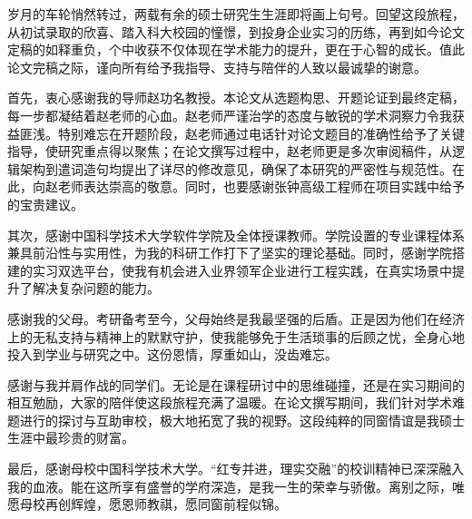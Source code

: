 \begin{acknowledgements}

岁月的车轮悄然转过，两载有余的硕士研究生生涯即将画上句号。回望这段旅程，从初试录取的欣喜、踏入科大校园的憧憬，到投身企业实习的历练，再到如今论文定稿的如释重负，个中收获不仅体现在学术能力的提升，更在于心智的成长。值此论文完稿之际，谨向所有给予我指导、支持与陪伴的人致以最诚挚的谢意。

首先，衷心感谢我的导师赵功名教授。本论文从选题构思、开题论证到最终定稿，每一步都凝结着赵老师的心血。赵老师严谨治学的态度与敏锐的学术洞察力令我获益匪浅。特别难忘在开题阶段，赵老师通过电话针对论文题目的准确性给予了关键指导，使研究重点得以聚焦；在论文撰写过程中，赵老师更是多次审阅稿件，从逻辑架构到遣词造句均提出了详尽的修改意见，确保了本研究的严密性与规范性。在此，向赵老师表达崇高的敬意。同时，也要感谢张钟高级工程师在项目实践中给予的宝贵建议。

其次，感谢中国科学技术大学软件学院及全体授课教师。学院设置的专业课程体系兼具前沿性与实用性，为我的科研工作打下了坚实的理论基础。同时，感谢学院搭建的实习双选平台，使我有机会进入业界领军企业进行工程实践，在真实场景中提升了解决复杂问题的能力。

感谢我的父母。考研备考至今，父母始终是我最坚强的后盾。正是因为他们在经济上的无私支持与精神上的默默守护，使我能够免于生活琐事的后顾之忧，全身心地投入到学业与研究之中。这份恩情，厚重如山，没齿难忘。

感谢与我并肩作战的同学们。无论是在课程研讨中的思维碰撞，还是在实习期间的相互勉励，大家的陪伴使这段旅程充满了温暖。在论文撰写期间，我们针对学术难题进行的探讨与互助审校，极大地拓宽了我的视野。这段纯粹的同窗情谊是我硕士生涯中最珍贵的财富。

最后，感谢母校中国科学技术大学。“红专并进，理实交融”的校训精神已深深融入我的血液。能在这所享有盛誉的学府深造，是我一生的荣幸与骄傲。离别之际，唯愿母校再创辉煌，愿恩师教祺，愿同窗前程似锦。

\end{acknowledgements}
